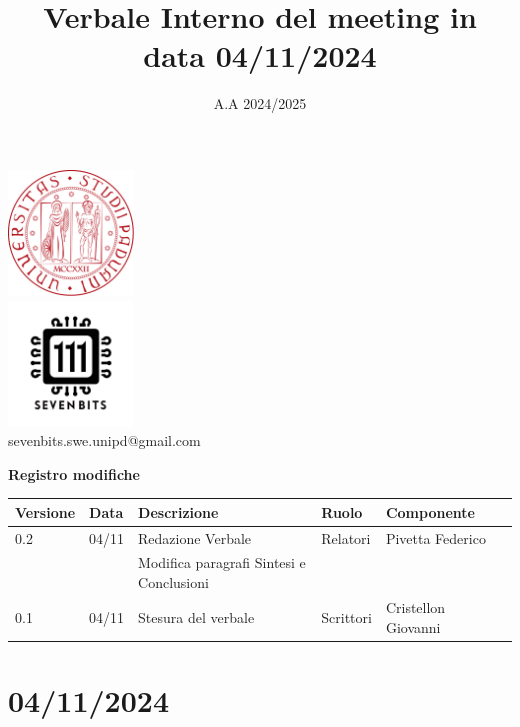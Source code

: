 \documentclass[12pt]{article}
\title{Verbale Interno del meeting in data 04/11/2024}
\date{A.A 2024/2025}
\begin{document}
\maketitle
\begin{center}
\includegraphics[width=0.25\textwidth]{LogoUnipd}\\
\includegraphics[width=0.25\textwidth]{Sevenbitslogo}\\
sevenbits.swe.unipd@gmail.com\\
\vspace{2mm}

\textbf{Registro modifiche}\\
\vspace{2mm}
\begin{tabular}{|l|l|l|l|l|l|}
\hline
\textbf{Versione} & \textbf{Data} & \textbf{Descrizione} & \textbf{Ruolo} & \textbf{Componente} \\
\hline
0.2 & 04/11 & Redazione Verbale & Relatori & Pivetta Federico\\
& & Modifica paragrafi Sintesi e Conclusioni & & \\
\hline
0.1 & 04/11 & Stesura del verbale & Scrittori & Cristellon Giovanni\\
\hline
\end{tabular}
\end{center}

\tableofcontents
\newpage
\section{04/11/2024}
\end{document}
